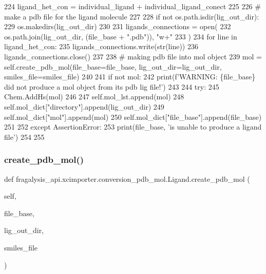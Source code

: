 \begin{DoxyCode}
224         ligand\_het\_con = individual\_ligand + individual\_ligand\_conect
225 
226         \textcolor{comment}{# make a pdb file for the ligand molecule}
227 
228         \textcolor{keywordflow}{if} \textcolor{keywordflow}{not} os.path.isdir(lig\_out\_dir):
229             os.makedirs(lig\_out\_dir)
230 
231         ligands\_connections = open(
232             os.path.join(lig\_out\_dir, (file\_base + \textcolor{stringliteral}{".pdb"})), \textcolor{stringliteral}{"w+"}
233         )
234         \textcolor{keywordflow}{for} line \textcolor{keywordflow}{in} ligand\_het\_con:
235             ligands\_connections.write(str(line))
236         ligands\_connections.close()
237 
238         \textcolor{comment}{# making pdb file into mol object}
239         mol = self.create\_pdb\_mol(file\_base=file\_base, lig\_out\_dir=lig\_out\_dir, smiles\_file=smiles\_file)
240 
241         \textcolor{keywordflow}{if} \textcolor{keywordflow}{not} mol:
242             print(f\textcolor{stringliteral}{'WARNING: \{file\_base\} did not produce a mol object from its pdb lig file!'})
243 
244         \textcolor{keywordflow}{try}:
245             Chem.AddHs(mol)
246 
247             self.mol\_lst.append(mol)
248             self.mol\_dict[\textcolor{stringliteral}{"directory"}].append(lig\_out\_dir)
249             self.mol\_dict[\textcolor{stringliteral}{"mol"}].append(mol)
250             self.mol\_dict[\textcolor{stringliteral}{"file\_base"}].append(file\_base)
251 
252         \textcolor{keywordflow}{except} AssertionError:
253             print(file\_base, \textcolor{stringliteral}{'is unable to produce a ligand file'})
254 
255 
\end{DoxyCode}
\mbox{\label{classfragalysis__api_1_1xcimporter_1_1conversion__pdb__mol_1_1_ligand_a4603fdd993d7b6b4cebea13a5ada16c2}} 
\subsubsection{\texorpdfstring{create\+\_\+pdb\+\_\+mol()}{create\_pdb\_mol()}}
{\footnotesize\ttfamily def fragalysis\+\_\+api.\+xcimporter.\+conversion\+\_\+pdb\+\_\+mol.\+Ligand.\+create\+\_\+pdb\+\_\+mol (\begin{DoxyParamCaption}\item[{}]{self,  }\item[{}]{file\+\_\+base,  }\item[{}]{lig\+\_\+out\+\_\+dir,  }\item[{}]{smiles\+\_\+file }\end{DoxyParamCaption})}

